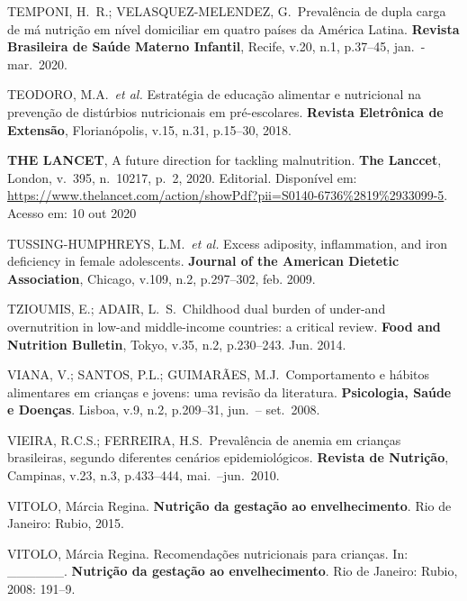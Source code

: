 \bigbreak

\noindent TEMPONI, H.\ R.; VELASQUEZ-MELENDEZ, G.\ Prevalência de dupla carga de má nutrição em nível domiciliar em quatro países da América Latina. \textbf{Revista Brasileira de Saúde Materno Infantil}, Recife, v.20, n.1, p.37--45, jan.\ - mar.\ 2020.

\bigbreak

\noindent TEODORO, M.A.\ \textit{et al.} Estratégia de educação alimentar e nutricional na prevenção de distúrbios nutricionais em pré-escolares. \textbf{Revista Eletrônica de Extensão}, Florianópolis, v.15, n.31, p.15--30, 2018.

\bigbreak

\noindent \textbf{THE LANCET}, A future direction for tackling malnutrition. \textbf{The Lanccet}, London, v.\ 395, n.\ 10217, p.\ 2, 2020. Editorial. Disponível em: \url{https://www.thelancet.com/action/showPdf?pii=S0140-6736\%2819\%2933099-5}. Acesso em: 10 out 2020

\bigbreak

\noindent TUSSING-HUMPHREYS, L.M.\ \textit{et al.} Excess adiposity, inflammation, and iron deficiency in female adolescents. \textbf{Journal of the American Dietetic Association}, Chicago, v.109, n.2, p.297–302, feb. 2009. 

\bigbreak

\noindent TZIOUMIS, E.; ADAIR, L.\ S.\ Childhood dual burden of under-and overnutrition in low-and middle-income countries: a critical review. \textbf{Food and Nutrition Bulletin}, Tokyo, v.35, n.2, p.230--243. Jun. 2014.

\bigbreak

\noindent VIANA, V.; SANTOS, P.L.; GUIMARÃES, M.J.\ Comportamento e hábitos alimentares em crianças e jovens: uma revisão da literatura. \textbf{Psicologia, Saúde e Doenças}. Lisboa, v.9, n.2, p.209--31, jun.\ – set.\ 2008.

\bigbreak

\noindent VIEIRA, R.C.S.; FERREIRA, H.S.\ Prevalência de anemia em crianças brasileiras, segundo diferentes cenários epidemiológicos. \textbf{Revista de Nutrição}, Campinas, v.23, n.3, p.433--444, mai.\ –jun.\ 2010.

\bigbreak

\noindent VITOLO, Márcia Regina. \textbf{Nutrição da gestação ao envelhecimento}. Rio de Janeiro: Rubio, 2015.

\bigbreak

\noindent VITOLO, Márcia Regina. Recomendações nutricionais para crianças. In: \_\_\_\_\_\_. \textbf{Nutrição da gestação ao envelhecimento}. Rio de Janeiro: Rubio, 2008: 191--9.

